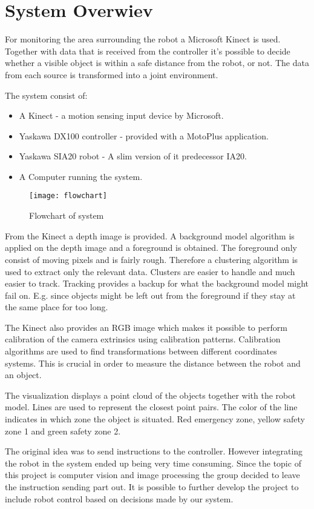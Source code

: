 
\section{System Overwiev}

For monitoring the area surrounding the robot a Microsoft Kinect is used. Together with data that is received from the controller it's possible to decide whether a visible object is within a safe distance from the robot, or not. The data from each source is transformed into a joint environment.

The system consist of:
\begin{itemize}
\item A Kinect - a motion sensing input device by Microsoft.
\item Yaskawa DX100 controller - provided with a MotoPlus application.
\item Yaskawa SIA20 robot - A slim version of it predecessor IA20.
\item A Computer running the system.
\end{itemize}

\begin{figure}[H]
\begin{center}
\texttt{[image: flowchart]}
\caption{Flowchart of system}
\label{flowchart}
\end{center}
\end{figure}




From the Kinect a depth image is provided. A background model algorithm is applied on the depth image and a foreground is obtained. The foreground only consist of moving pixels and is fairly rough. Therefore a clustering algorithm is used to extract only the relevant data. Clusters are easier to handle and much easier to track. Tracking provides a backup for what the background model might fail on. E.g. since objects might be left out from the foreground if they stay at the same place for too long.

The Kinect also provides an RGB image which makes it possible to perform calibration of the camera extrinsics using calibration patterns. Calibration algorithms are used to find transformations between different coordinates systems. This is crucial in order to measure the distance between the robot and an object.

The visualization displays a point cloud of the objects together with the robot model. Lines are used to represent the closest point pairs. The color of the line indicates in which zone the object is situated. Red emergency zone, yellow safety zone 1 and green safety zone 2.

The original idea was to send instructions to the controller. However integrating the robot in the system ended up being very time consuming. Since the topic of this project is computer vision and image processing the group decided to leave the instruction sending part out. It is possible to further develop the project to include robot control based on decisions made by our system.   


